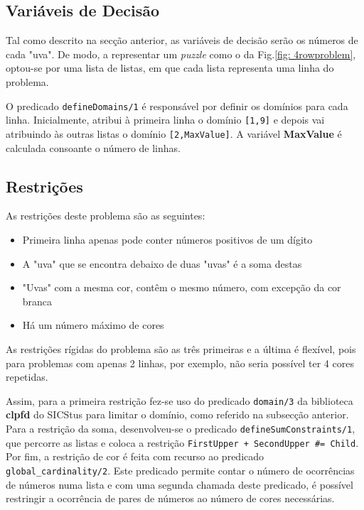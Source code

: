 \subsection{Variáveis de Decisão}

Tal como descrito na secção anterior, as variáveis de decisão serão os números de cada "uva".
De modo, a representar um \textit{puzzle} como o da Fig.\ref{fig: 4rowproblem}, optou-se por uma lista de listas, em que cada lista representa uma linha do problema.

O predicado \verb|defineDomains/1| é responsável por definir os domínios para cada linha. Inicialmente, atribui à primeira linha o domínio \verb|[1,9]| e depois vai atribuindo às outras listas o domínio \verb|[2,MaxValue]|. A variável \textbf{MaxValue} é calculada consoante o número de linhas.

\subsection{Restrições}

As restrições deste problema são as seguintes:
\begin{itemize}
    \item Primeira linha apenas pode conter números positivos de um dígito
    \item A "uva" que se encontra debaixo de duas "uvas" é a soma destas
    \item "Uvas" com a mesma cor, contêm o mesmo número, com excepção da cor branca
    \item Há um número máximo de cores
\end{itemize}

As restrições rígidas do problema são as três primeiras e a última é flexível, pois para problemas com apenas 2 linhas, por exemplo, não seria possível ter 4 cores repetidas.

Assim, para a primeira restrição fez-se uso do predicado \verb|domain/3| da biblioteca \textbf{clpfd} do SICStus para limitar o domínio, como referido na subsecção anterior.
Para a restrição da soma, desenvolveu-se o predicado \verb|defineSumConstraints/1|, que percorre as listas e coloca a restrição \verb|FirstUpper + SecondUpper #= Child|.
Por fim, a restrição de cor é feita com recurso ao predicado \verb|global_cardinality/2|. Este predicado permite contar o número de ocorrências de números numa lista e com uma segunda chamada deste predicado, é possível restringir a ocorrência de pares de números ao número de cores necessárias.
